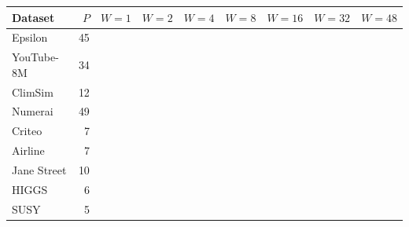 \begin{tabular}{l r|rrrrrrr}
\toprule
Dataset & $P$ & $W=1$ & $W=2$ & $W=4$ & $W=8$ & $W=16$ & $W=32$ & $W=48$ \\
\midrule
Epsilon & 45 &  &  &  &  &  &  &  \\
YouTube-8M & 34 &  &  &  &  &  &  &  \\
ClimSim & 12 &  &  &  &  &  &  &  \\
Numerai & 49 &  &  &  &  &  &  &  \\
Criteo & 7 &  &  &  &  &  &  &  \\
Airline & 7 &  &  &  &  &  &  &  \\
Jane Street & 10 &  &  &  &  &  &  &  \\
HIGGS & 6 &  &  &  &  &  &  &  \\
SUSY & 5 &  &  &  &  &  &  &  \\
\bottomrule
\end{tabular}
